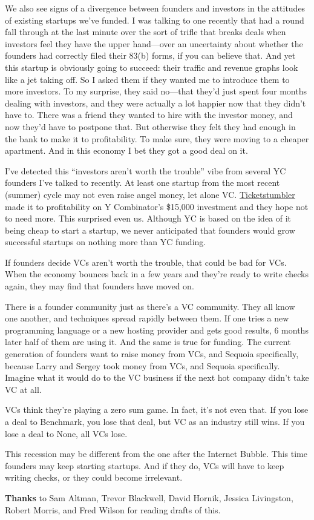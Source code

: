 We also see signs of a divergence between founders and investors in the
attitudes of existing startups we've funded. I was talking to one
recently that had a round fall through at the last minute over the sort
of trifle that breaks deals when investors feel they have the upper
hand---over an uncertainty about whether the founders had correctly
filed their 83(b) forms, if you can believe that. And yet this startup
is obviously going to succeed: their traffic and revenue graphs look
like a jet taking off. So I asked them if they wanted me to introduce
them to more investors. To my surprise, they said no---that they'd just
spent four months dealing with investors, and they were actually a lot
happier now that they didn't have to. There was a friend they wanted to
hire with the investor money, and now they'd have to postpone that. But
otherwise they felt they had enough in the bank to make it to
profitability. To make sure, they were moving to a cheaper apartment.
And in this economy I bet they got a good deal on it.

I've detected this ``investors aren't worth the trouble'' vibe from
several YC founders I've talked to recently. At least one startup from
the most recent (summer) cycle may not even raise angel money, let alone
VC. \href{http://ticketstumbler.com}{Ticketstumbler} made it to
profitability on Y Combinator's \$15,000 investment and they hope not to
need more. This surprised even us. Although YC is based on the idea of
it being cheap to start a startup, we never anticipated that founders
would grow successful startups on nothing more than YC funding.

If founders decide VCs aren't worth the trouble, that could be bad for
VCs. When the economy bounces back in a few years and they're ready to
write checks again, they may find that founders have moved on.

There is a founder community just as there's a VC community. They all
know one another, and techniques spread rapidly between them. If one
tries a new programming language or a new hosting provider and gets good
results, 6 months later half of them are using it. And the same is true
for funding. The current generation of founders want to raise money from
VCs, and Sequoia specifically, because Larry and Sergey took money from
VCs, and Sequoia specifically. Imagine what it would do to the VC
business if the next hot company didn't take VC at all.

VCs think they're playing a zero sum game. In fact, it's not even that.
If you lose a deal to Benchmark, you lose that deal, but VC as an
industry still wins. If you lose a deal to None, all VCs lose.

This recession may be different from the one after the Internet Bubble.
This time founders may keep starting startups. And if they do, VCs will
have to keep writing checks, or they could become irrelevant.

\textbf{Thanks} to Sam Altman, Trevor Blackwell, David Hornik, Jessica
Livingston, Robert Morris, and Fred Wilson for reading drafts of this.

